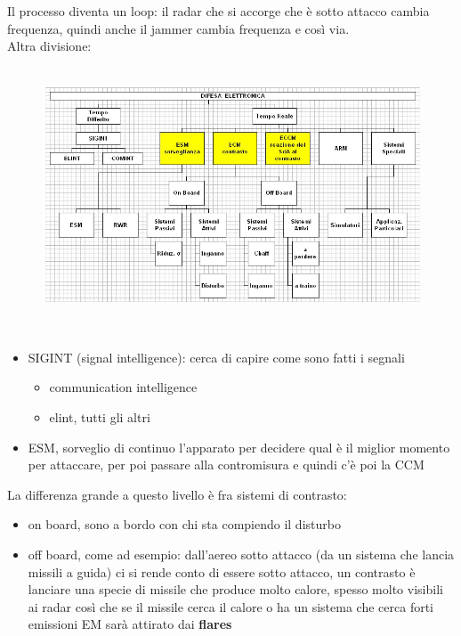 \documentclass[oneside, 12pt]{extbook}
\begin{document}
Il processo diventa un loop: il radar che si accorge che è sotto attacco cambia frequenza, quindi anche il jammer cambia frequenza e così via.
\\Altra divisione:\\\\
\begin{figure}[!h]
	\includegraphics[scale=0.3]{immagini/localization/elec_warefare_2.png}
\end{figure}\\
\begin{itemize}
	\item SIGINT (signal intelligence): cerca di capire come sono fatti i segnali
	\begin{itemize}
		\item communication intelligence
		\item elint, tutti gli altri
	\end{itemize}
	\item ESM, sorveglio di continuo l'apparato per decidere qual è il miglior momento per attaccare, per poi passare alla contromisura e quindi c'è poi la CCM
\end{itemize}
La differenza grande a questo livello è fra sistemi di contrasto:
\begin{itemize}
	\item on board, sono a bordo con chi sta compiendo il disturbo
	\item off board, come ad esempio: dall'aereo sotto attacco (da un sistema che lancia missili a guida) ci si rende conto di essere sotto attacco, un contrasto è lanciare una specie di missile che produce molto calore, spesso molto visibili ai radar così che se il missile cerca il calore o ha un sistema che cerca forti emissioni EM sarà attirato dai \textbf{flares}
\end{itemize}
\end{document}
